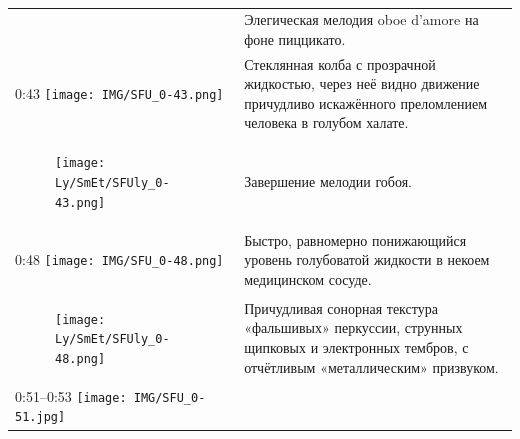 \begin{longtable}[]{@{}ll@{}}
\begin{minipage}[t]{0.32\columnwidth}
\strut
\end{minipage} & \begin{minipage}[t]{0.62\columnwidth}\raggedright\strut
Элегическая мелодия oboe d'amore на фоне пиццикато.\strut
\end{minipage}\tabularnewline
\begin{minipage}[t]{0.32\columnwidth}\raggedright\strut
0:43
\texttt{[image: IMG/SFU\_0-43.png]}\strut
\end{minipage} & \begin{minipage}[t]{0.62\columnwidth}\raggedright\strut
Стеклянная колба с прозрачной жидкостью,
через неё видно движение причудливо искажённого
преломлением человека в голубом халате.\strut
\end{minipage}\tabularnewline
\begin{minipage}[t]{0.32\columnwidth}\raggedright\strut
\begin{figure}
\centering
\texttt{[image: Ly/SmEt/SFUly\_0-43.png]}
\caption{}
\end{figure}
\strut
\end{minipage} & \begin{minipage}[t]{0.62\columnwidth}\raggedright\strut
Завершение мелодии гобоя.\strut
\end{minipage}\tabularnewline
\begin{minipage}[t]{0.32\columnwidth}\raggedright\strut
0:48
\texttt{[image: IMG/SFU\_0-48.png]}\strut
\end{minipage} & \begin{minipage}[t]{0.62\columnwidth}\raggedright\strut
Быстро, равномерно понижающийся уровень
голубоватой жидкости в некоем медицинском сосуде.\strut
\end{minipage}\tabularnewline
\begin{minipage}[t]{0.32\columnwidth}\raggedright\strut
\begin{figure}
\centering
\texttt{[image: Ly/SmEt/SFUly\_0-48.png]}
\caption{}
\end{figure}
\strut
\end{minipage} & \begin{minipage}[t]{0.62\columnwidth}\raggedright\strut
Причудливая сонорная текстура «фальшивых»
перкуссии, струнных щипковых и электронных тембров,
с отчётливым «металлическим» призвуком.\strut
\end{minipage}\tabularnewline
\begin{minipage}[t]{0.32\columnwidth}\raggedright\strut
0:51--0:53
\texttt{[image: IMG/SFU\_0-51.jpg]}\strut
\end{minipage} & \begin{minipage}[t]{0.62\columnwidth}\raggedright\strut

\end{minipage}
\end{longtable}
